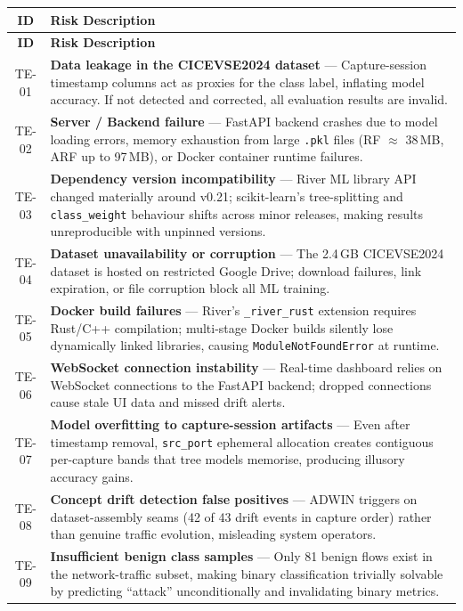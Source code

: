 \documentclass[11pt, a4paper]{article}
\newcommand{\col}[1]{\texttt{\small #1}}
\begin{document}
\small
\begin{longtable}{|c|p{13cm}|}
\hline
\rowcolor{red!10}
\textbf{ID} & \textbf{Risk Description} \\
\hline
\endfirsthead
\hline
\rowcolor{red!10}
\textbf{ID} & \textbf{Risk Description} \\
\hline
\endhead

TE-01 & \textbf{Data leakage in the CICEVSE2024 dataset} --- Capture-session timestamp columns act as proxies for the class label, inflating model accuracy. If not detected and corrected, all evaluation results are invalid. \\
\hline
TE-02 & \textbf{Server / Backend failure} --- FastAPI backend crashes due to model loading errors, memory exhaustion from large \col{.pkl} files (RF $\approx$ 38\,MB, ARF up to 97\,MB), or Docker container runtime failures. \\
\hline
TE-03 & \textbf{Dependency version incompatibility} --- River ML library API changed materially around v0.21; scikit-learn's tree-splitting and \col{class\_weight} behaviour shifts across minor releases, making results unreproducible with unpinned versions. \\
\hline
TE-04 & \textbf{Dataset unavailability or corruption} --- The 2.4\,GB CICEVSE2024 dataset is hosted on restricted Google Drive; download failures, link expiration, or file corruption block all ML training. \\
\hline
TE-05 & \textbf{Docker build failures} --- River's \col{\_river\_rust} extension requires Rust/C++ compilation; multi-stage Docker builds silently lose dynamically linked libraries, causing \col{ModuleNotFoundError} at runtime. \\
\hline
TE-06 & \textbf{WebSocket connection instability} --- Real-time dashboard relies on WebSocket connections to the FastAPI backend; dropped connections cause stale UI data and missed drift alerts. \\
\hline
TE-07 & \textbf{Model overfitting to capture-session artifacts} --- Even after timestamp removal, \col{src\_port} ephemeral allocation creates contiguous per-capture bands that tree models memorise, producing illusory accuracy gains. \\
\hline
TE-08 & \textbf{Concept drift detection false positives} --- ADWIN triggers on dataset-assembly seams (42 of 43 drift events in capture order) rather than genuine traffic evolution, misleading system operators. \\
\hline
TE-09 & \textbf{Insufficient benign class samples} --- Only 81 benign flows exist in the network-traffic subset, making binary classification trivially solvable by predicting ``attack'' unconditionally and invalidating binary metrics. \\

\end{longtable}
\end{document}
